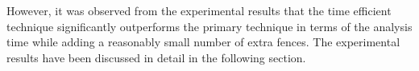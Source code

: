 However, it was observed from the experimental results that the time
efficient technique significantly outperforms the primary technique in terms of 
the analysis time while adding a reasonably small number of extra \sc
fences. The experimental results have been discussed in detail in the 
following section.